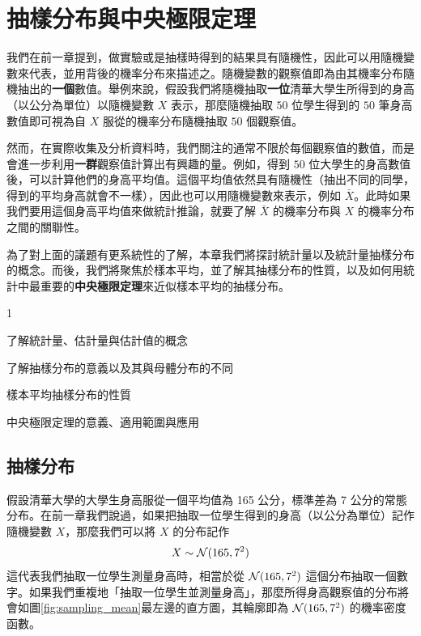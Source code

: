 \chapter{抽樣分布與中央極限定理}
    我們在前一章提到，做實驗或是抽樣時得到的結果具有隨機性，因此可以用隨機變數來代表，並用背後的機率分布來描述之。隨機變數的觀察值即為由其機率分布隨機抽出的\textbf{一個}數值。舉例來說，假設我們將隨機抽取\textbf{一位}清華大學生所得到的身高（以公分為單位）以隨機變數 $X$ 表示，那麼隨機抽取 $50$ 位學生得到的 $50$ 筆身高數值即可視為自 $X$ 服從的機率分布隨機抽取 $50$ 個觀察值。

    \medskip
    
    然而，在實際收集及分析資料時，我們關注的通常不限於每個觀察值的數值，而是會進一步利用\textbf{一群}觀察值計算出有興趣的量。例如，得到 $50$ 位大學生的身高數值後，可以計算他們的身高平均值。這個平均值依然具有隨機性（抽出不同的同學，得到的平均身高就會不一樣），因此也可以用隨機變數來表示，例如 $\bar{X}$。此時如果我們要用這個身高平均值來做統計推論，就要了解 $\bar{X}$ 的機率分布與 $X$ 的機率分布之間的關聯性。

    \medskip
    
    為了對上面的議題有更系統性的了解，本章我們將探討統計量以及統計量抽樣分布的概念。而後，我們將聚焦於樣本平均，並了解其抽樣分布的性質，以及如何用統計中最重要的\textbf{中央極限定理}來近似樣本平均的抽樣分布。
    
    \begin{introduction}{1}
        \item 了解統計量、估計量與估計值的概念
        \item 了解抽樣分布的意義以及其與母體分布的不同
        \item 樣本平均抽樣分布的性質
        \item 中央極限定理的意義、適用範圍與應用
    \end{introduction}

\section{抽樣分布}
    假設清華大學的大學生身高服從一個平均值為 165 公分，標準差為 7 公分的常態分布。在前一章我們說過，如果把抽取一位學生得到的身高（以公分為單位）記作隨機變數 $X$，那麼我們可以將 $X$ 的分布記作
    \smallskip
    \[X \sim \mathcal{N}(165, 7^2)\]
    \smallskip
    這代表我們抽取一位學生測量身高時，相當於從 $\mathcal{N}(165,7^2)$ 這個分布抽取一個數字。如果我們重複地「抽取一位學生並測量身高」，那麼所得身高觀察值的分布將會如圖\ref{fig:sampling_mean}最左邊的直方圖，其輪廓即為 $\mathcal{N}(165, 7^2)$ 的機率密度函數。

